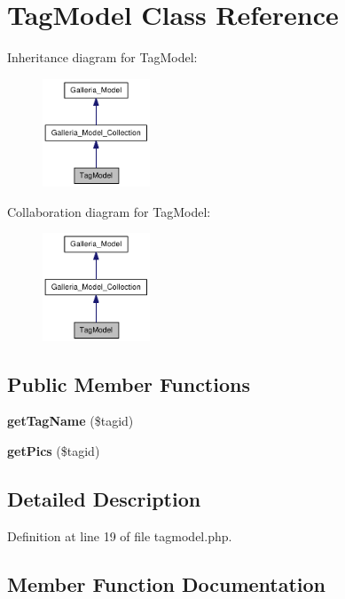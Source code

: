 \section{TagModel Class Reference}
\label{classTagModel}
Inheritance diagram for TagModel:\nopagebreak
\begin{figure}[H]
\begin{center}
\leavevmode
\includegraphics[width=91pt]{classTagModel__inherit__graph}
\end{center}
\end{figure}
Collaboration diagram for TagModel:\nopagebreak
\begin{figure}[H]
\begin{center}
\leavevmode
\includegraphics[width=91pt]{classTagModel__coll__graph}
\end{center}
\end{figure}
\subsection*{Public Member Functions}
\begin{CompactItemize}
\item 
{\bf getTagName} (\$tagid)
\item 
{\bf getPics} (\$tagid)
\end{CompactItemize}


\subsection{Detailed Description}


Definition at line 19 of file tagmodel.php.

\subsection{Member Function Documentation}
